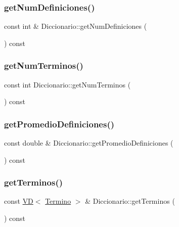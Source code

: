 \subsubsection{\texorpdfstring{get\+Num\+Definiciones()}{getNumDefiniciones()}}
{\footnotesize\ttfamily const int \& Diccionario\+::get\+Num\+Definiciones (\begin{DoxyParamCaption}{ }\end{DoxyParamCaption}) const}

\mbox{\label{class_diccionario_a79a9b966438e99fc637e62673c121c14}} 
\subsubsection{\texorpdfstring{get\+Num\+Terminos()}{getNumTerminos()}}
{\footnotesize\ttfamily const int Diccionario\+::get\+Num\+Terminos (\begin{DoxyParamCaption}{ }\end{DoxyParamCaption}) const}

\mbox{\label{class_diccionario_afc533a9cf6311689b2b582a07ee81434}} 
\subsubsection{\texorpdfstring{get\+Promedio\+Definiciones()}{getPromedioDefiniciones()}}
{\footnotesize\ttfamily const double \& Diccionario\+::get\+Promedio\+Definiciones (\begin{DoxyParamCaption}{ }\end{DoxyParamCaption}) const}

\mbox{\label{class_diccionario_a5cc88c4cf7fee49b715f31bea0c2abd3}} 
\subsubsection{\texorpdfstring{get\+Terminos()}{getTerminos()}}
{\footnotesize\ttfamily const \mbox{\hyperlink{class_v_d}{VD}}$<$ \mbox{\hyperlink{class_termino}{Termino}} $>$ \& Diccionario\+::get\+Terminos (\begin{DoxyParamCaption}{ }\end{DoxyParamCaption}) const}



